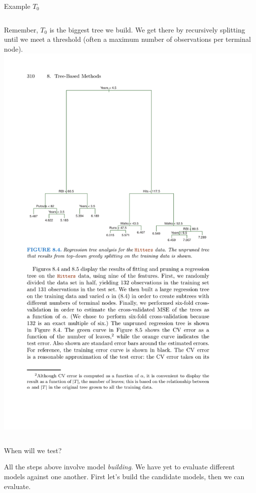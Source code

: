 \documentclass[mathserif, aspectratio=169]{beamer}
\begin{document}
\begin{frame}{Example $T_0$}
\begin{columns}
Remember, $T_0$ is the biggest tree we build.  We get there by recursively splitting until we meet a threshold (often a maximum number of observations per terminal node).
\includegraphics[height=0.9\textheight]{complex_tree}

\end{columns}

\end{frame}


\begin{frame}{When will we test?}

All the steps above involve model \textit{building}.  We have yet to evaluate different models against one another.  First let's build the candidate models, then we can evaluate.
\end{frame}
\end{document}
